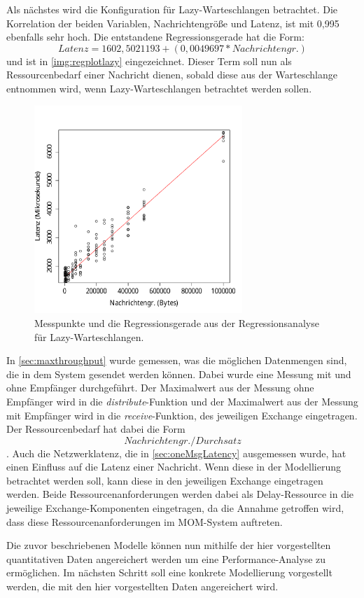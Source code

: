 Als nächstes wird die Konfiguration für Lazy-Warteschlangen betrachtet. Die Korrelation der beiden Variablen, Nachrichtengröße und Latenz, ist mit 0,995 ebenfalls sehr hoch. Die entstandene Regressionsgerade hat die Form: \[Latenz = 1602,5021193 + (0,0049697 * Nachrichtengr.)\] und ist in \autoref{img:regplotlazy} eingezeichnet. Dieser Term soll nun als Ressourcenbedarf einer Nachricht dienen, sobald diese aus der Warteschlange entnommen wird, wenn Lazy-Warteschlangen betrachtet werden sollen.
\begin{figure}
\center
  \includegraphics[width=0.7\textwidth]{images/modelling/oneMsgLazyRegression.pdf}
  \caption{Messpunkte und die Regressionsgerade aus der Regressionsanalyse für Lazy-Warteschlangen.}
  \label{img:regplotlazy}
\end{figure}

In \autoref{sec:maxthroughput} wurde gemessen, was die möglichen Datenmengen sind, die in dem System gesendet werden können. Dabei wurde eine Messung mit und ohne Empfänger durchgeführt. Der Maximalwert aus der Messung ohne Empfänger wird in die \emph{distribute}-Funktion und der Maximalwert aus der Messung mit Empfänger wird in die \emph{receive}-Funktion, des jeweiligen Exchange eingetragen. Der Ressourcenbedarf hat dabei die Form \[Nachrichtengr. /  Durchsatz\]. 
Auch die Netzwerklatenz, die in \autoref{sec:oneMsgLatency} ausgemessen wurde, hat einen Einfluss auf die Latenz einer Nachricht. Wenn diese in der Modellierung betrachtet werden soll, kann diese in den jeweiligen Exchange eingetragen werden. Beide Ressourcenanforderungen werden dabei als Delay-Ressource in die jeweilige Exchange-Komponenten eingetragen, da die Annahme getroffen wird, dass diese Ressourcenanforderungen im MOM-System auftreten. \par
Die zuvor beschriebenen Modelle können nun mithilfe der hier vorgestellten quantitativen Daten angereichert werden um eine Performance-Analyse zu ermöglichen. Im nächsten Schritt soll eine konkrete Modellierung vorgestellt werden, die mit den hier vorgestellten Daten angereichert wird. 

